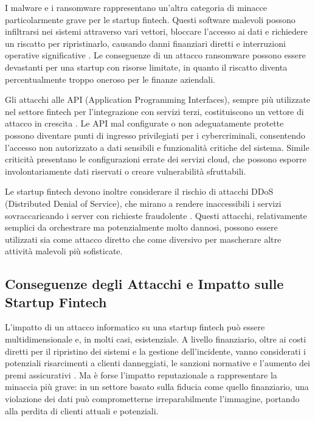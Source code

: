 \documentclass[a4paper,12pt]{report}
\begin{document}
I malware e i ransomware rappresentano un'altra categoria di minacce particolarmente grave per le startup fintech. Questi software malevoli possono infiltrarsi nei sistemi attraverso vari vettori, bloccare l'accesso ai dati e richiedere un riscatto per ripristinarlo, causando danni finanziari diretti e interruzioni operative significative \cite{cyberThreatsFintech}. Le conseguenze di un attacco ransomware possono essere devastanti per una startup con risorse limitate, in quanto il riscatto diventa percentualmente troppo oneroso per le finanze aziendali.

Gli attacchi alle API (Application Programming Interfaces), sempre più utilizzate nel settore fintech per l'integrazione con servizi terzi, costituiscono un vettore di attacco in crescita \cite{fintechChallenges}. Le API mal configurate o non adeguatamente protette possono diventare punti di ingresso privilegiati per i cybercriminali, consentendo l'accesso non autorizzato a dati sensibili e funzionalità critiche del sistema. Simile criticità presentano le configurazioni errate dei servizi cloud, che possono esporre involontariamente dati riservati o creare vulnerabilità sfruttabili.

Le startup fintech devono inoltre considerare il rischio di attacchi DDoS (Distributed Denial of Service), che mirano a rendere inaccessibili i servizi sovraccaricando i server con richieste fraudolente \cite{fintechChallenges}. Questi attacchi, relativamente semplici da orchestrare ma potenzialmente molto dannosi, possono essere utilizzati sia come attacco diretto che come diversivo per mascherare altre attività malevoli più sofisticate.

\subsection{Conseguenze degli Attacchi e Impatto sulle Startup Fintech}

L'impatto di un attacco informatico su una startup fintech può essere multidimensionale e, in molti casi, esistenziale. A livello finanziario, oltre ai costi diretti per il ripristino dei sistemi e la gestione dell'incidente, vanno considerati i potenziali risarcimenti a clienti danneggiati, le sanzioni normative e l'aumento dei premi assicurativi \cite{fintechChallenges}. Ma è forse l'impatto reputazionale a rappresentare la minaccia più grave: in un settore basato sulla fiducia come quello finanziario, una violazione dei dati può comprometterne irreparabilmente l'immagine, portando alla perdita di clienti attuali e potenziali.
\end{document}
